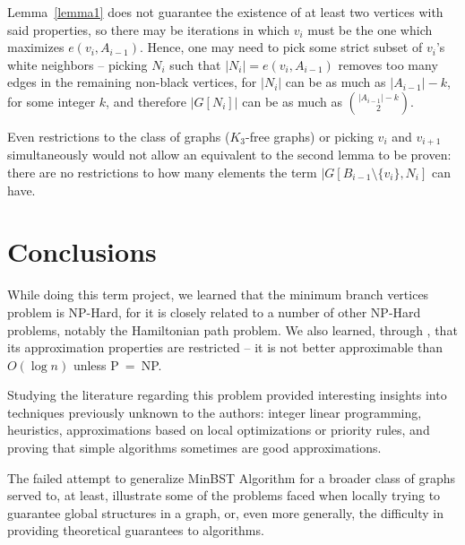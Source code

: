\documentclass[12pt]{article}
\begin{document}
Lemma~\ref{lemma1} does not guarantee the existence of at least two vertices with said properties, so there may be iterations in which $v_i$ must be the one which maximizes $e(v_i, A_{i - 1})$.
Hence, one may need to pick some strict subset of $v_i$'s white neighbors -- picking $N_i$ such that $|N_i| = e(v_i, A_{i - 1})$ removes too many edges in the remaining non-black vertices, for $|N_i|$ can be as much as $|A_{i - 1}| - k$, for some integer $k$, and therefore $|G[N_i]|$ can be as much as ${|A_{i - 1}| - k}\choose{2}$.

Even restrictions to the class of graphs ($K_3$-free graphs) or picking $v_i$ and $v_{i + 1}$ simultaneously would not allow an equivalent to the second lemma to be proven: there are no restrictions to how many elements the term $|G[B_{i-1} \setminus \{v_i\}, N_i]$ can have.

\section{Conclusions} \label{sec:conclusions}
While doing this term project, we learned that the minimum branch vertices problem is NP-Hard, for it is closely related to a number of other NP-Hard problems, notably the Hamiltonian path problem.
We also learned, through \cite{salamon2010}, that its approximation properties are restricted -- it is not better approximable than $O(\log n)$ unless P~=~NP.

Studying the literature regarding this problem provided interesting insights into techniques previously unknown to the authors: integer linear programming, heuristics, approximations based on local optimizations or priority rules, and proving that simple algorithms sometimes are good approximations.

The failed attempt to generalize MinBST Algorithm for a broader class of graphs served to, at least, illustrate some of the problems faced when locally trying to guarantee global structures in a graph, or, even more generally, the difficulty in providing theoretical guarantees to algorithms.



\end{document}
